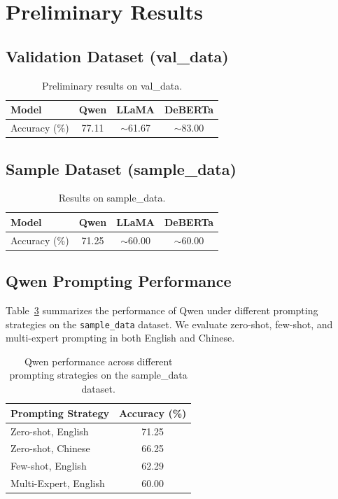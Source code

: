 \documentclass[11pt]{article}
\begin{document}
\section{Preliminary Results}

\subsection{Validation Dataset (val\_data)}

\begin{table}[H]
\centering
\begin{tabular}{lccc}
\toprule
Model & Qwen & LLaMA & DeBERTa \\
\midrule
Accuracy (\%) & 77.11 & $\sim$61.67 & $\sim$83.00  \\
\bottomrule
\end{tabular}
\caption{Preliminary results on val\_data.}
\label{tab:val-results}
\end{table}

\subsection{Sample Dataset (sample\_data)}

\begin{table}[H]
\centering
\begin{tabular}{lccc}
\toprule
Model & Qwen & LLaMA & DeBERTa \\
\midrule
Accuracy (\%) & 71.25 & $\sim$60.00 & $\sim$60.00 \\
\bottomrule
\end{tabular}
\caption{Results on sample\_data.}
\label{tab:sample-results}
\end{table}

\subsection{Qwen Prompting Performance}

Table~\ref{tab:qwen-prompting} summarizes the performance of Qwen under different prompting strategies on the \texttt{sample\_data} dataset. We evaluate zero-shot, few-shot, and multi-expert prompting in both English and Chinese.

\begin{table}[H]
\centering
\begin{tabular}{l c}
\toprule
Prompting Strategy & Accuracy (\%) \\
\midrule
Zero-shot, English & 71.25 \\
Zero-shot, Chinese & 66.25 \\
Few-shot, English & 62.29 \\
Multi-Expert, English & 60.00 \\
\bottomrule
\end{tabular}
\caption{Qwen performance across different prompting strategies on the sample\_data dataset.}
\label{tab:qwen-prompting}
\end{table}
\end{document}
